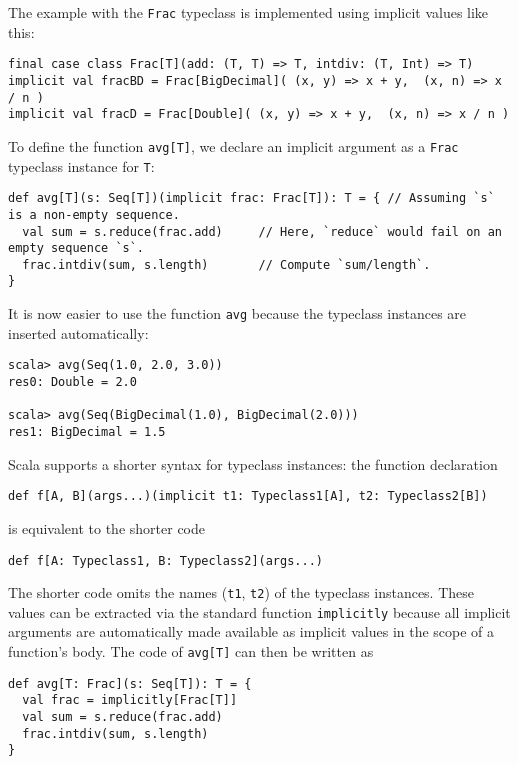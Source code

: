 The example with the \lstinline!Frac! typeclass is implemented using
implicit values like this:
\begin{lstlisting}
final case class Frac[T](add: (T, T) => T, intdiv: (T, Int) => T)
implicit val fracBD = Frac[BigDecimal]( (x, y) => x + y,  (x, n) => x / n )
implicit val fracD = Frac[Double]( (x, y) => x + y,  (x, n) => x / n )
\end{lstlisting}
To define the function \lstinline!avg[T]!, we declare an implicit
argument as a \lstinline!Frac! typeclass instance for \lstinline!T!:
\begin{lstlisting}
def avg[T](s: Seq[T])(implicit frac: Frac[T]): T = { // Assuming `s` is a non-empty sequence.
  val sum = s.reduce(frac.add)     // Here, `reduce` would fail on an empty sequence `s`.
  frac.intdiv(sum, s.length)       // Compute `sum/length`.
}
\end{lstlisting}
It is now easier to use the function \lstinline!avg! because the
typeclass instances are inserted automatically:
\begin{lstlisting}
scala> avg(Seq(1.0, 2.0, 3.0))
res0: Double = 2.0

scala> avg(Seq(BigDecimal(1.0), BigDecimal(2.0)))
res1: BigDecimal = 1.5
\end{lstlisting}

Scala supports a shorter syntax for typeclass instances: the function
declaration
\begin{lstlisting}
def f[A, B](args...)(implicit t1: Typeclass1[A], t2: Typeclass2[B])
\end{lstlisting}
is equivalent to the shorter code 
\begin{lstlisting}
def f[A: Typeclass1, B: Typeclass2](args...)
\end{lstlisting}
The shorter code omits the names (\lstinline!t1!, \lstinline!t2!)
of the typeclass instances. These values can be extracted via the
standard function \lstinline!implicitly! because all implicit arguments
are automatically made available as implicit values in the scope of
a function's body. The code of \lstinline!avg[T]! can then be written
as
\begin{lstlisting}
def avg[T: Frac](s: Seq[T]): T = {
  val frac = implicitly[Frac[T]]
  val sum = s.reduce(frac.add)
  frac.intdiv(sum, s.length)
}
\end{lstlisting}

